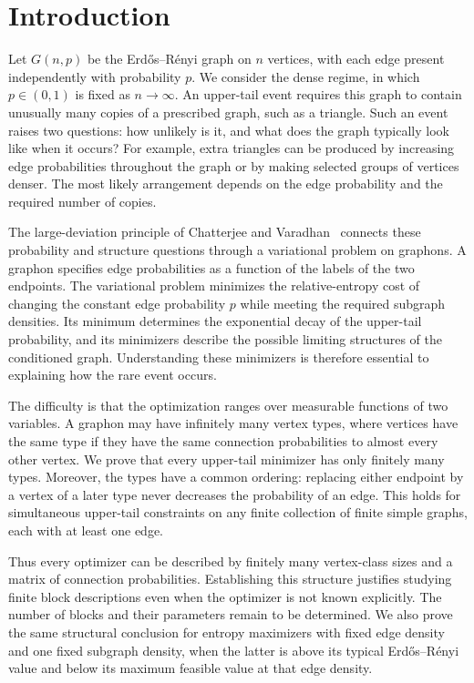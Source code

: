\section{Introduction}\label{sec:introduction}

Let $G(n,p)$ be the Erd\H{o}s--R\'enyi graph on $n$ vertices, with each edge
present independently with probability $p$. We consider the dense regime,
in which $p\in(0,1)$ is fixed as $n\to\infty$. An upper-tail event requires
this graph to contain unusually many copies of a prescribed graph, such
as a triangle. Such an event raises two questions: how unlikely is it,
and what does the graph typically look like when it occurs? For example,
extra triangles can be produced by increasing edge probabilities
throughout the graph or by making selected groups of vertices denser.
The most likely arrangement depends on the edge probability and the
required number of copies.

The large-deviation principle of Chatterjee and
Varadhan~\cite{ChatterjeeVaradhanLDP} connects these probability and
structure questions through a variational problem on graphons. A graphon
specifies edge probabilities as a function of the labels of the two
endpoints. The variational problem minimizes the relative-entropy cost
of changing the constant edge probability $p$ while meeting the required
subgraph densities. Its minimum determines the exponential decay of the
upper-tail probability, and its minimizers describe the possible limiting
structures of the conditioned graph. Understanding these minimizers is
therefore essential to explaining how the rare event occurs.

The difficulty is that the optimization ranges over measurable functions
of two variables. A graphon may have infinitely many vertex types, where
vertices have the same type if they have the same connection probabilities
to almost every other vertex. We prove that every upper-tail minimizer
has only finitely many types. Moreover, the types have a common ordering:
replacing either endpoint by a vertex of a later type never decreases
the probability of an edge. This holds for simultaneous upper-tail
constraints on any finite collection of finite simple graphs, each with
at least one edge.

Thus every optimizer can be described by finitely many vertex-class
sizes and a matrix of connection probabilities. Establishing this
structure justifies studying finite block descriptions even when the
optimizer is not known explicitly. The number of blocks and their
parameters remain to be determined. We also prove the same structural
conclusion for entropy maximizers with fixed edge density and one fixed
subgraph density, when the latter is above its typical Erd\H{o}s--R\'enyi
value and below its maximum feasible value at that edge density.

